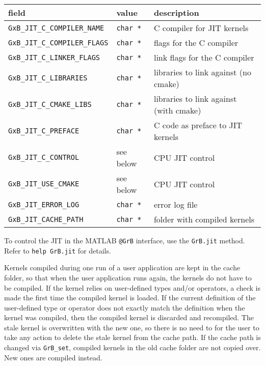 \documentclass[12pt]{article}
\begin{document}
\vspace{0.15in}
{\footnotesize
\begin{tabular}{lll}
\hline
field                       & value         & description \\
\hline
\verb'GxB_JIT_C_COMPILER_NAME' & \verb'char *' & C compiler for JIT kernels \\
\verb'GxB_JIT_C_COMPILER_FLAGS'& \verb'char *' & flags for the C compiler \\
\verb'GxB_JIT_C_LINKER_FLAGS' & \verb'char *' & link flags for the C compiler \\
\verb'GxB_JIT_C_LIBRARIES'    & \verb'char *' & libraries to link against (no cmake) \\
\verb'GxB_JIT_C_CMAKE_LIBS'   & \verb'char *' & libraries to link against (with cmake) \\
\verb'GxB_JIT_C_PREFACE'      & \verb'char *' & C code as preface to JIT kernels \\
\verb'GxB_JIT_C_CONTROL'      & see below     & CPU JIT control \\
\verb'GxB_JIT_USE_CMAKE'      & see below     & CPU JIT control \\
\verb'GxB_JIT_ERROR_LOG'      & \verb'char *' & error log file \\
\verb'GxB_JIT_CACHE_PATH'     & \verb'char *' & folder with compiled kernels \\
\hline
\end{tabular}
}
\vspace{0.15in}

To control the JIT in the MATLAB \verb'@GrB' interface, use the \verb'GrB.jit'
method.  Refer to \verb'help GrB.jit' for details.

Kernels compiled during one run of a user application are kept in the cache
folder, so that when the user application runs again, the kernels do not have
to be compiled.  If the kernel relies on user-defined types and/or operators, a
check is made the first time the compiled kernel is loaded.  If the current
definition of the user-defined type or operator does not exactly match the
definition when the kernel was compiled, then the compiled kernel is discarded
and recompiled.  The stale kernel is overwritten with the new one, so there is
no need to for the user to take any action to delete the stale kernel from the
cache path.  If the cache path is changed via \verb'GrB_set', compiled kernels
in the old cache folder are not copied over.  New ones are compiled instead.
\end{document}
